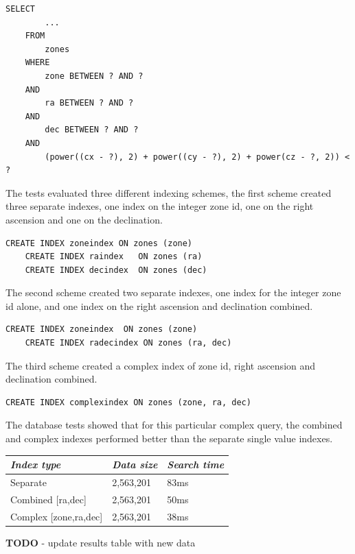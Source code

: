 \documentclass{article}
\begin{document}
\begin{lstlisting}[style=SQL]
    SELECT
        ...
    FROM
        zones
    WHERE
        zone BETWEEN ? AND ?
    AND
        ra BETWEEN ? AND ?
    AND
        dec BETWEEN ? AND ?
    AND
        (power((cx - ?), 2) + power((cy - ?), 2) + power(cz - ?, 2)) < ?
\end{lstlisting}

The tests evaluated three different indexing schemes, the first scheme created three separate indexes, one index on the integer zone id, one on the right ascension and one on the declination.

\begin{lstlisting}[style=SQL]
    CREATE INDEX zoneindex ON zones (zone)
    CREATE INDEX raindex   ON zones (ra)
    CREATE INDEX decindex  ON zones (dec)
\end{lstlisting}

The second scheme created two separate indexes, one index for the integer zone id alone, and one index on the right ascension and declination combined.

\begin{lstlisting}[style=SQL]
    CREATE INDEX zoneindex  ON zones (zone)
    CREATE INDEX radecindex ON zones (ra, dec)
\end{lstlisting}

The third scheme created a complex index of zone id, right ascension and declination combined.

\begin{lstlisting}[style=SQL]
    CREATE INDEX complexindex ON zones (zone, ra, dec)
\end{lstlisting}

The database tests showed that for this particular complex query, the combined and complex indexes performed better than the separate single value indexes.

\begin{table}[h]
\centering
\begin{tabular}{|l|l|l|}
\hline
\textit{Index type} & \textit{Data size} & \textit{Search time} \\ \hline
Separate & 2,563,201 & 83ms \\ \hline
Combined [ra,dec] & 2,563,201 & 50ms \\ \hline
Complex  [zone,ra,dec] & 2,563,201 & 38ms \\ \hline
\end{tabular}
\end{table}

\textbf{TODO} - update results table with new data
\end{document}
